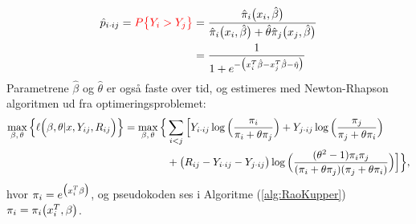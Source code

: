 \documentclass[11pt,a4paper]{article}
\begin{document}
\begin{align}
    \hat{p}_{i\cdot ij}=\textcolor{red}{{P\big{\{}Y_i>Y_j\big{\}}}}
    &=\frac{\hat{\pi}_i\big{(}x_i,\hat{\beta}\big{)}}{\hat{\pi}_i\big{(}x_i,\hat{\beta}\big{)}+\hat{\theta}\hat{\pi}_j\big{(}x_j,\hat{\beta}\big{)}}\\
    &=\frac{1}{1+e^{-\big{(}x_i^T\hat{\beta}-x_j^T\hat{\beta}-\hat{\eta}\big{)}}}
\end{align}
Parametrene $\hat{\beta}$ og $\hat{\theta}$ er også faste over tid, og estimeres med Newton-Rhapson algoritmen ud fra optimeringsproblemet:
\begin{align*}
\max_{\beta,\,\theta} \Big{\{}\ell\Big{(}\beta,\theta|x,Y_{ij},R_{ij}\Big{)}\Big{\}}=
\max_{\beta,\,\theta} \Big{\{}& \sum_{i<j}\Big{[}Y_{i\cdot ij}\log\Big{(}\frac{\pi_i}{\pi_i+\theta\pi_j}\Big{)}
+ Y_{j\cdot ij}\log\Big{(}\frac{\pi_j}{\pi_j+\theta\pi_i}\Big{)}\\
&+ \big{(}R_{ij}-Y_{i\cdot ij}-Y_{j\cdot ij}\big{)} \log\Big{(}\frac{(\theta^2-1)\pi_i \pi_j}{(\pi_i+\theta\pi_j)(\pi_j+\theta\pi_i)}\Big{)}\Big{]}\Big{\}},\\
\end{align*}
 hvor $\pi_i=e^{\big{(}x_i^T\beta\big{)}}$, og pseudokoden ses i Algoritme (\ref{alg:RaoKupper})\sout{$\pi_i=\pi_i\big{(}x_i^T,\beta\big{)}$}.
 \\
 
\end{document}

